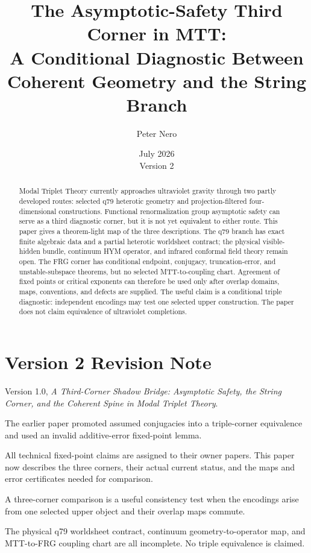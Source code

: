 \documentclass[11pt]{article}
\title{The Asymptotic-Safety Third Corner in MTT:\\
\large A Conditional Diagnostic Between Coherent Geometry and the String Branch}
\author{Peter Nero}
\date{July 2026\\Version 2}
\begin{document}
\maketitle

\begin{abstract}
Modal Triplet Theory currently approaches ultraviolet gravity through two
partly developed routes: selected q79 heterotic geometry and
projection-filtered four-dimensional constructions. Functional
renormalization group asymptotic safety can serve as a third diagnostic
corner, but it is not yet equivalent to either route. This paper gives a
theorem-light map of the three descriptions. The q79 branch has exact finite
algebraic data and a partial heterotic worldsheet contract; the physical
visible-hidden bundle, continuum HYM operator, and infrared conformal field
theory remain open. The FRG corner has conditional endpoint, conjugacy,
truncation-error, and unstable-subspace theorems, but no selected
MTT-to-coupling chart. Agreement of fixed points or critical exponents can
therefore be used only after overlap domains, maps, conventions, and defects
are supplied. The useful claim is a conditional triple diagnostic:
independent encodings may test one selected upper construction. The paper
does not claim equivalence of ultraviolet completions.
\end{abstract}

\section*{Version 2 Revision Note}
\begin{description}[leftmargin=3.2cm,style=nextline]
\item[Supersedes] Version 1.0, \emph{A Third-Corner Shadow Bridge:
Asymptotic Safety, the String Corner, and the Coherent Spine in Modal
Triplet Theory}.
\item[Reason] The earlier paper promoted assumed conjugacies into a
triple-corner equivalence and used an invalid additive-error fixed-point
lemma.
\item[Resolution] All technical fixed-point claims are assigned to their
owner papers. This paper now describes the three corners, their actual
current status, and the maps and error certificates needed for comparison.
\item[Retained result] A three-corner comparison is a useful consistency
test when the encodings arise from one selected upper object and their
overlap maps commute.
\item[Remaining boundary] The physical q79 worldsheet contract,
continuum geometry-to-operator map, and MTT-to-FRG coupling chart are all
incomplete. No triple equivalence is claimed.
\end{description}
\end{document}
